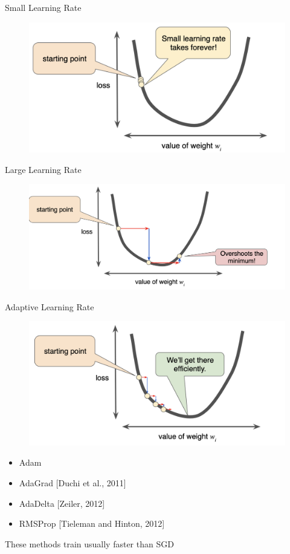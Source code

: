 \documentclass[12pt]{beamer}
\begin{document}
\begin{frame}{Small Learning Rate}
	\begin{figure}
		\centering
		\includegraphics[width=0.8\linewidth]{img/small_lr.png}
	\end{figure}


\end{frame}
\begin{frame}{Large Learning Rate}
	\begin{figure}
		\centering
		\includegraphics[width=\linewidth]{img/large_lr.png}
	\end{figure}

\end{frame}
\begin{frame}{Adaptive Learning Rate}
	\begin{figure}
		\centering
		\includegraphics[width=0.8\linewidth]{img/adaptive_lr.png}
	\end{figure}

\begin{itemize}
	\item Adam \citep{Kingma.Ba.2015}
	\item AdaGrad [Duchi et al., 2011]
	\item AdaDelta [Zeiler, 2012]
	\item RMSProp [Tieleman and Hinton, 2012]
\end{itemize}

These methods train usually faster than SGD

\end{frame}
\end{document}
